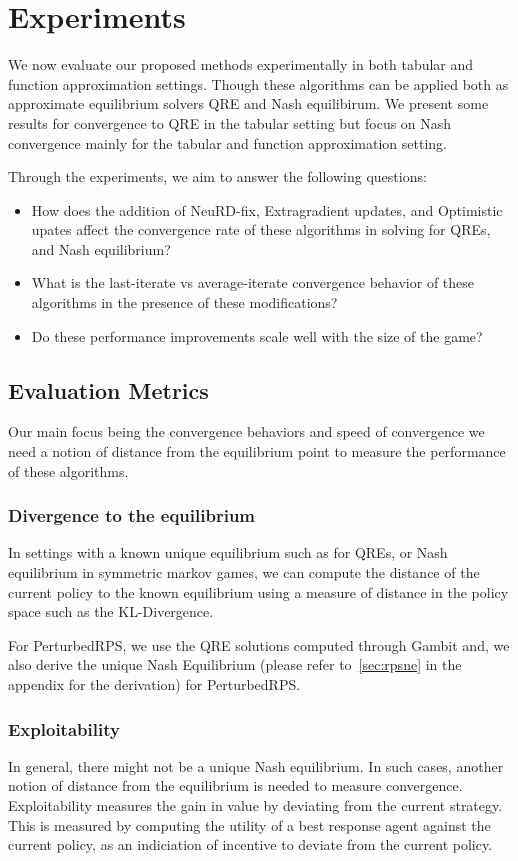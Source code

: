 \chapter{Experiments}

We now evaluate our proposed methods experimentally in both tabular and function approximation settings.
Though these algorithms can be applied both as approximate equilibrium solvers QRE and Nash equilibirum.
We present some results for convergence to QRE in the tabular setting but focus on Nash convergence mainly 
for the tabular and function approximation setting.

Through the experiments, we aim to answer the following questions:
\begin{itemize}
	\item How does the addition of NeuRD-fix, Extragradient updates, and Optimistic upates
	      affect the convergence rate of these algorithms in solving for QREs, and Nash equilibrium?
	\item What is the last-iterate vs average-iterate convergence behavior of these algorithms in the presence of these modifications?
	\item Do these performance improvements scale well with the size of the game?
\end{itemize}

\section{Evaluation Metrics}
Our main focus being the convergence behaviors and speed of convergence we need a notion of 
distance from the equilibrium point to measure the performance of these algorithms.

\subsection{Divergence to the equilibrium}
In settings with a known unique equilibrium such as for QREs, or Nash equilibrium in symmetric markov games, 
we can compute the distance of the current policy to the known equilibrium using a measure of distance in the policy space such as the KL-Divergence. 

For PerturbedRPS, we use the QRE solutions computed through Gambit and, we also derive the unique
Nash Equilibrium (please refer to~\ref{sec:rpsne} in the appendix for the derivation) for
PerturbedRPS.\

\subsection{Exploitability}
In general, there might not be a unique Nash equilibrium. 
In such cases, another notion of distance from the equilibrium is needed to measure convergence.
Exploitability measures the gain in value by deviating from the current strategy.
This is measured by computing the utility of a best response agent against the current policy, as an indiciation 
of incentive to deviate from the current policy.

